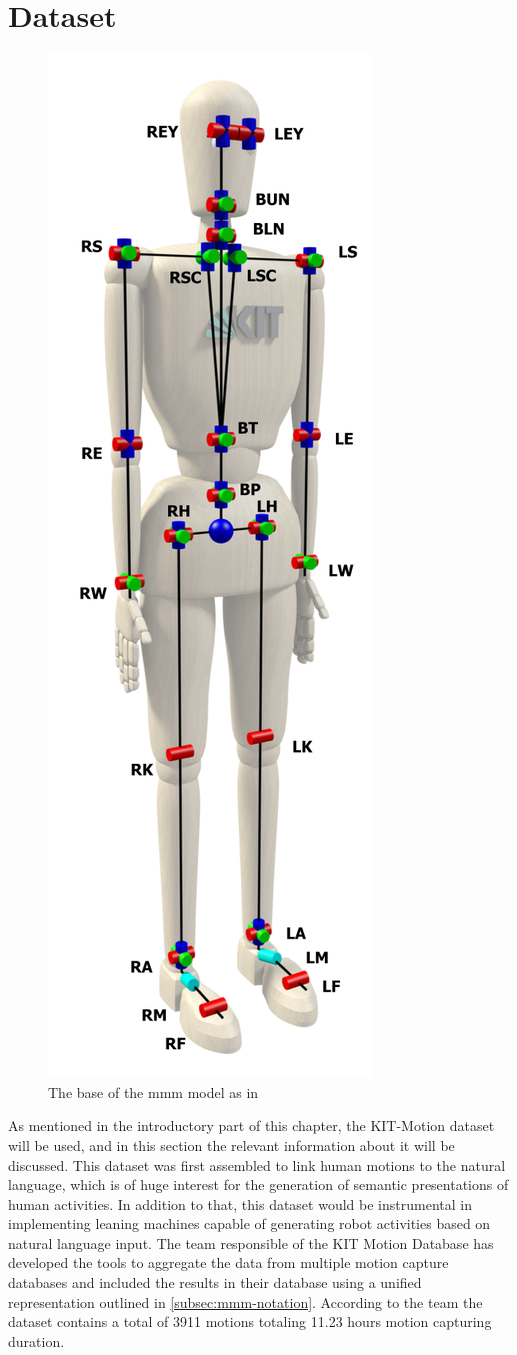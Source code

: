 	\section{Dataset}
		\begin{figure}
			\vspace{-5.5cm}
			\begin{center}
				\includegraphics[width=.32\textwidth]{img/mmm-model.png}
				\caption{The base of the mmm model as in \cite{Plappert2016}}
				\label{fig:mmm-model}
			\end{center}
		\end{figure}
		As mentioned in the introductory part of this chapter, the KIT-Motion dataset\cite{Plappert2016} will be used, and in this section the relevant information about it will be discussed. This dataset was first assembled to link human motions to the natural language, which is of huge interest for the generation of semantic presentations of human activities. In addition to that, this dataset would be instrumental in implementing leaning machines capable of generating robot activities based on natural language input\cite{Plappert2016}. The team responsible of the KIT Motion Database has developed the tools to aggregate the data from multiple motion capture databases and included the results in their database using a unified representation outlined in \ref{subsec:mmm-notation}. According to the team the dataset contains a total of 3911 motions totaling 11.23 hours motion capturing duration\cite{Plappert2016}.
